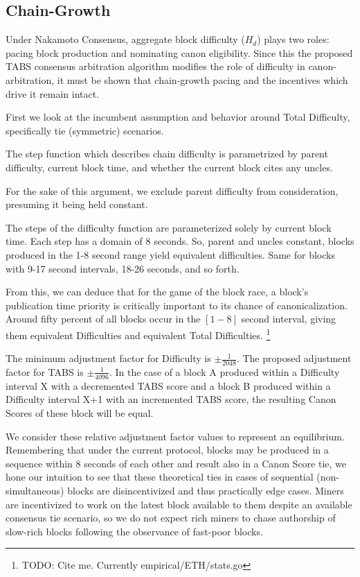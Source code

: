 \documentclass[11pt]{article}
\theoremstyle{plain}
\begin{document}
{\subsection{\normalsize{Chain-Growth}}

Under Nakamoto Consensus, aggregate block difficulty ($H_d$) plays two roles:
pacing block production and nominating canon eligibility.
Since this the proposed TABS consensus arbitration algorithm modifies the role of difficulty in canon-arbitration,
it must be shown that chain-growth pacing and the incentives which drive it remain intact.

First we look at the incumbent assumption and behavior around Total Difficulty, specifically tie (symmetric) scenarios.

The step function which describes chain difficulty is parametrized by
parent difficulty, current block time, and whether the current block cites any uncles.

For the sake of this argument, we exclude parent difficulty from consideration, presuming it being held constant.

The steps of the difficulty function are parameterized solely by current block time.
Each step has a domain of 8 seconds.
    So, parent and uncles constant, blocks produced in the 1-8 second range yield equivalent difficulties.
    Same for blocks with 9-17 second intervals, 18-26 seconds, and so forth.

From this, we can deduce that for the game of the block race,
a block's publication time priority is critically important to its chance of canonicalization.
Around fifty percent of all blocks occur in the $[1-8]$ second interval,
giving them equivalent Difficulties and equivalent Total Difficulties.\nolinebreak
\footnote{TODO: Cite me. Currently empirical/ETH/stats.go}

The minimum adjustment factor for Difficulty is $\pm\frac{1}{2048}$.
The proposed adjustment factor for TABS is $\pm\frac{1}{4096}$.
In the case of a block A produced within a Difficulty interval X with a decremented TABS score
and
a block B produced within a Difficulty interval X+1 with an incremented TABS score,
the resulting Canon Scores of these block will be equal.

We consider these relative adjustment factor values to represent an equilibrium.
Remembering that under the current protocol, blocks may be produced in a sequence within 8 seconds of each
other and result also in a Canon Score tie, we hone our intuition to see that these theoretical
ties in cases of sequential (non-simultaneous) blocks are disincentivized and thus practically edge cases.
Miners are incentivized to work on the latest block available to them despite an available consensus tie scenario,
so we do not expect rich miners to chase authorship of slow-rich blocks following the observance of fast-poor blocks.



}
\end{document}
